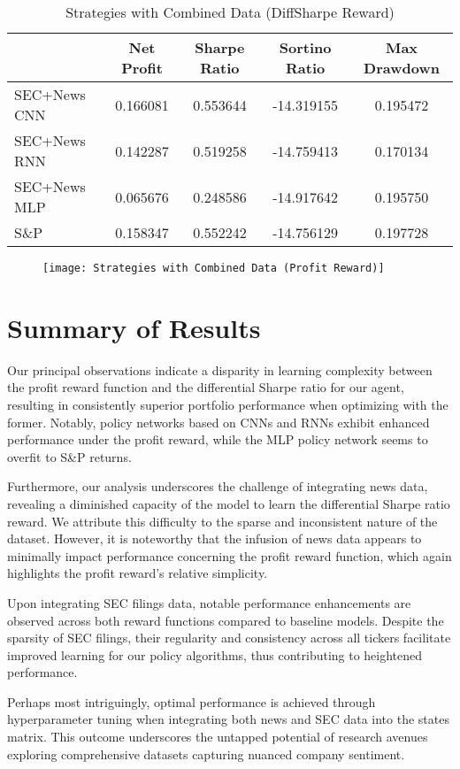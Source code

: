 \begin{table}[htbp]
    \centering
    \caption{Strategies with Combined Data (DiffSharpe Reward)}
      \begin{tabular}{lcccc}
      \toprule
            & Net Profit & Sharpe Ratio & Sortino Ratio & Max Drawdown \\
      \midrule
      SEC+News CNN & 0.166081 & 0.553644 & -14.319155 & 0.195472 \\
      SEC+News RNN & 0.142287 & 0.519258 & -14.759413 & 0.170134 \\
      SEC+News MLP & 0.065676 & 0.248586 & -14.917642 & 0.195750 \\
      S\&P   & 0.158347 & 0.552242 & -14.756129 & 0.197728 \\
      \bottomrule
      \end{tabular}%
    \label{tab:combined_profit}%
  \end{table}%

  \begin{center}
    \begin{figure}
    \texttt{[image: Strategies with Combined Data (Profit Reward)]}
    \end{figure}
    \label{fig:combined_profit}
\end{center}


\section{Summary of Results}
Our principal observations indicate a disparity in learning complexity between the profit reward function and the differential Sharpe ratio for our agent, resulting in consistently superior portfolio performance when optimizing with the former. 
Notably, policy networks based on CNNs and RNNs exhibit enhanced performance under the profit reward, while the MLP policy network seems to overfit to S\&P returns.

Furthermore, our analysis underscores the challenge of integrating news data, revealing a diminished capacity of the model to learn the differential Sharpe ratio reward. We attribute this difficulty to the sparse and inconsistent nature of the dataset. However, it is noteworthy that the infusion of news data appears to minimally impact performance concerning the profit reward function, which again highlights the profit reward's relative simplicity.

Upon integrating SEC filings data, notable performance enhancements are observed across both reward functions compared to baseline models. Despite the sparsity of SEC filings, their regularity and consistency across all tickers facilitate improved learning for our policy algorithms, thus contributing to heightened performance.

Perhaps most intriguingly, optimal performance is achieved through hyperparameter tuning when integrating both news and SEC data into the states matrix. This outcome underscores the untapped potential of research avenues exploring comprehensive datasets capturing nuanced company sentiment.